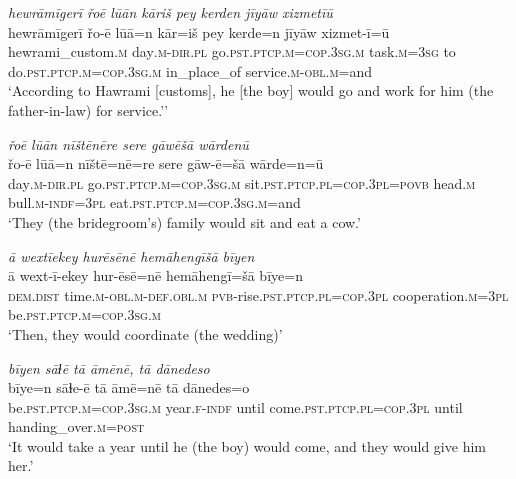 \ea \label{RE.12}
\textit{hewrāmīgerī řoē lūān kāriš pey kerden jīyāw xizmetīū} \\ 
\gll hewrāmīgerī řo-ē lūā=n kār=iš pey kerde=n jīyāw xizmet-ī=ū \\ 
 hewrami\_custom\textsc{.m} day\textsc{.m}\textsc{-dir}\textsc{.pl} go\textsc{.pst}\textsc{.ptcp}\textsc{.m}\textsc{=cop}\textsc{.3sg}\textsc{.m} task\textsc{.m}\textsc{=3sg} to do\textsc{.pst}\textsc{.ptcp}\textsc{.m}\textsc{=cop}\textsc{.3sg}\textsc{.m} in\_place\_of service\textsc{.m}\textsc{-obl}\textsc{.m}=and \\ 
\glt `According to Hawrami [customs], he [the boy] would go and work for him (the father-in-law) for service.’'
\z 
 
\ea \label{RE.13}
\textit{řoē lūān nīštēnēre sere gāwēšā wārdenū} \\ 
\gll řo-ē lūā=n nīštē=nē=re sere gāw-ē=šā wārde=n=ū \\ 
 day\textsc{.m}\textsc{-dir}\textsc{.pl} go\textsc{.pst}\textsc{.ptcp}\textsc{.m}\textsc{=cop}\textsc{.3sg}\textsc{.m} sit\textsc{.pst}\textsc{.ptcp}\textsc{.pl}\textsc{=cop}\textsc{.3pl}\textsc{=\textsc{povb}} head\textsc{.m} bull\textsc{.m}\textsc{-indf}\textsc{=3pl} eat\textsc{.pst}\textsc{.ptcp}\textsc{.m}\textsc{=cop}\textsc{.3sg}\textsc{.m}=and \\ 
\glt `They (the bridegroom’s) family would sit and eat a cow.'
\z 
 
\ea \label{RE.14}
\textit{ā wextīekey hurēsēnē hemāhengīšā bīyen} \\ 
\gll ā wext-ī-ekey hur-ēsē=nē hemāhengī=šā bīye=n \\ 
 \textsc{dem.dist} time\textsc{.m}\textsc{-obl}\textsc{.m}\textsc{-def}\textsc{.obl}\textsc{.m} \textsc{pvb-}rise\textsc{.pst}\textsc{.ptcp}\textsc{.pl}\textsc{=cop}\textsc{.3pl} cooperation\textsc{.m}\textsc{=3pl} be\textsc{.pst}\textsc{.ptcp}\textsc{.m}\textsc{=cop}\textsc{.3sg}\textsc{.m} \\ 
\glt `Then, they would coordinate (the wedding)'
\z 
 
\ea \label{RE.15}
\textit{bīyen sāɫē tā āmēnē, tā dānedeso} \\ 
\gll bīye=n sāɫe-ē tā āmē=nē tā dānedes=o \\ 
 be\textsc{.pst}\textsc{.ptcp}\textsc{.m}\textsc{=cop}\textsc{.3sg}\textsc{.m} year\textsc{.f}\textsc{-indf} until come\textsc{.pst}\textsc{.ptcp}\textsc{.pl}\textsc{=cop}\textsc{.3pl} until handing\_over\textsc{.m}\textsc{=\textsc{post}} \\ 
\glt `It would take a year until he (the boy) would come, and they would give him her.'
\z 
 
